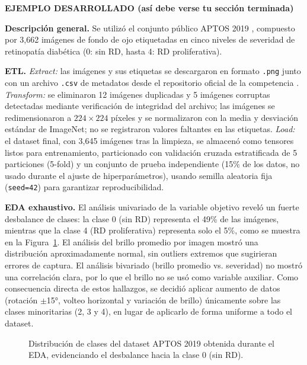 \documentclass[pdflatex,sn-mathphys-num]{sn-jnl}
\newenvironment{ejemplo}{%
  \par\noindent\textbf{\color{green!35!black}EJEMPLO DESARROLLADO (así debe verse tu sección terminada)}%
  \par\vspace{2pt}\noindent\small
}{%
  \par\normalfont\vspace{6pt}
}
\begin{document}
\begin{ejemplo}
\textbf{Descripción general.} Se utilizó el conjunto público APTOS 2019 \cite{bib4}, compuesto por 3{,}662 imágenes de fondo de ojo etiquetadas en cinco niveles de severidad de retinopatía diabética (0: sin RD, hasta 4: RD proliferativa).

\textbf{ETL.} \textit{Extract:} las imágenes y sus etiquetas se descargaron en formato \texttt{.png} junto con un archivo \texttt{.csv} de metadatos desde el repositorio oficial de la competencia \cite{bib4}. \textit{Transform:} se eliminaron 12 imágenes duplicadas y 5 imágenes corruptas detectadas mediante verificación de integridad del archivo; las imágenes se redimensionaron a $224\times224$ píxeles y se normalizaron con la media y desviación estándar de ImageNet; no se registraron valores faltantes en las etiquetas. \textit{Load:} el dataset final, con 3{,}645 imágenes tras la limpieza, se almacenó como tensores listos para entrenamiento, particionado con validación cruzada estratificada de 5 particiones (5-fold) y un conjunto de prueba independiente (15\% de los datos, no usado durante el ajuste de hiperparámetros), usando semilla aleatoria fija (\texttt{seed=42}) para garantizar reproducibilidad.

\textbf{EDA exhaustivo.} El análisis univariado de la variable objetivo reveló un fuerte desbalance de clases: la clase 0 (sin RD) representa el 49\% de las imágenes, mientras que la clase 4 (RD proliferativa) representa solo el 5\%, como se muestra en la Figura~\ref{fig:eda}. El análisis del brillo promedio por imagen mostró una distribución aproximadamente normal, sin outliers extremos que sugirieran errores de captura. El análisis bivariado (brillo promedio vs. severidad) no mostró una correlación clara, por lo que el brillo no se usó como variable auxiliar. Como consecuencia directa de estos hallazgos, se decidió aplicar aumento de datos (rotación $\pm$15°, volteo horizontal y variación de brillo) únicamente sobre las clases minoritarias (2, 3 y 4), en lugar de aplicarlo de forma uniforme a todo el dataset.
\end{ejemplo}

\begin{figure}[h]
\centering
\caption{Distribución de clases del dataset APTOS 2019 obtenida durante el EDA, evidenciando el desbalance hacia la clase 0 (sin RD).}
\label{fig:eda}
\end{figure}
\end{document}
